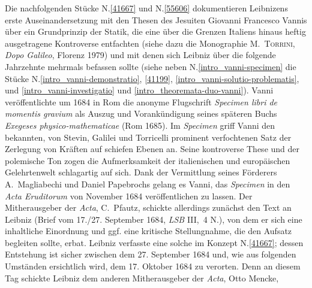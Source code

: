 \begin{ledgroup}
\footnotesize
\pstart
\noindent
Die nachfolgenden Stücke N.\;\ref{41667} und N.\;\ref{55606}
dokumentieren Leibnizens erste Auseinandersetzung 
mit den Thesen des Jesuiten
Giovanni Francesco Vannis
über ein Grundprinzip der Statik,
die eine über die Grenzen Italiens hinaus heftig ausgetragene Kontroverse entfachten
(siehe dazu die Monographie \cite{02126}\textsc{M.~Torrini}, \textit{Dopo Galileo}, Florenz 1979)
und mit denen sich Leibniz über die folgende Jahrzehnte mehrmals befassen sollte (siehe neben N.\;\ref{intro_vanni-specimen} die Stücke N.\;\ref{intro_vanni-demonstratio}, \ref{41199}, \ref{intro_vanni-solutio-problematis}, und \ref{intro_vanni-investigatio} und \ref{intro_theoremata-duo-vanni}).
\pend
\pstart
{}Vanni veröffentlichte um 1684 in Rom die anonyme Flugschrift \cite{01995}\textit{Specimen libri de momentis gravium} als Auszug und Vorankündigung seines späteren Buchs \cite{02000}\textit{Exegeses physico-mathematicae} (Rom 1685).
Im \textit{Specimen} griff Vanni den bekannten, von Stevin, Galilei und Torricelli prominent verfochtenen 
Satz der Zerlegung von Kräften auf schiefen Ebenen an. 
Seine kontroverse These und der polemische Ton zogen die Aufmerksamkeit der italienischen und europäischen Gelehrtenwelt schlagartig auf sich.
\pend
\pstart
Dank der Vermittlung 
seines Förderers
A.~Magliabechi
und Daniel Papebrochs
gelang es Vanni, das \cite{01995}\textit{Specimen} in den \cite{01023}\textit{Acta Eruditorum} von November 1684 veröffentlichen zu lassen.
Der Mitherausgeber der \cite{01023}\textit{Acta},
C.~Pfautz,
schickte allerdings zunächst den Text an Leibniz (\cite{02006}Brief vom 17./27. September 1684, \textit{LSB} III,~4 N.), von dem er sich eine inhaltliche Einordnung und ggf. eine kritische Stellungnahme, die den Aufsatz begleiten sollte, erbat.
Leibniz verfasste eine solche im Konzept N.\;\ref{41667}; dessen Entstehung ist sicher zwischen dem 27. September 1684 und, wie aus folgenden Umständen ersichtlich wird, dem 17. Oktober 1684 zu verorten.
Denn an diesem Tag schickte Leibniz dem anderen Mitherausgeber der \textit{Acta}, Otto Mencke,

\end{ledgroup}
